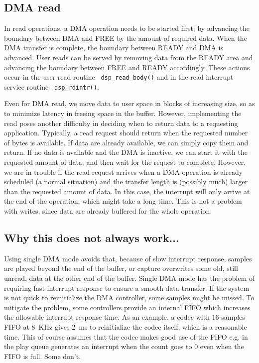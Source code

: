 \documentclass[11pt]{article}
\begin{document}
\subsection{DMA read}

In read operations, a DMA operation needs to be started first, by
advancing the boundary between DMA and FREE by the amount of required
data. When the DMA transfer is complete, the boundary between READY
and DMA is advanced. User reads can be served by removing data from
the READY area and advancing the boundary between FREE and READY
accordingly. These actions occur in the user read routine {\tt
dsp\_read\_body()} and in the read interrupt service routine {\tt
dsp\_rdintr()}.

Even for DMA read, we move data to user space in blocks of increasing
size, so as to minimize latency in freeing space in the buffer.
However, implementing the read poses another difficulty in deciding
when to return data to a requesting application. Typically,
a read request should return when the requested number of bytes is
available. If data are already available, we can simply copy them
and return. If no data is available and the DMA is inactive, we
can start it with the requested amount of data, and then wait for
the request to complete. However, we are in trouble if the read
request arrives when a DMA operation is already scheduled (a normal
situation) and the transfer length is (possibly much) larger than
the requested amount of data. In this case, the interrupt will only
arrive at the end of the operation, which might take a long time.
This is not a problem with writes, since data are already buffered
for the whole operation.

\subsection{Why this does not always work...}

Using single DMA mode avoids that, because of slow interrupt
response, samples are played beyond the end of the buffer, or
capture overwrites some old, still unread, data at the other end
of the buffer.
Single DMA mode has the problem of requiring fast interrupt
response  to ensure a smooth data transfer. If the system is not quick
to reinitialize the DMA controller, some samples might be missed. To
mitigate the problem, some controllers provide an internal FIFO which
increases the allowable interrupt response time. As an example, a
codec with 16-samples FIFO at 8~KHz gives 2~ms to reinitialize the
codec itself, which is a reasonable time.
This of course assumes that
the codec makes good use of the FIFO e.g. in the play queue generates
an interrupt when the count goes to 0 even when the FIFO is full. Some
don't.
\end{document}
